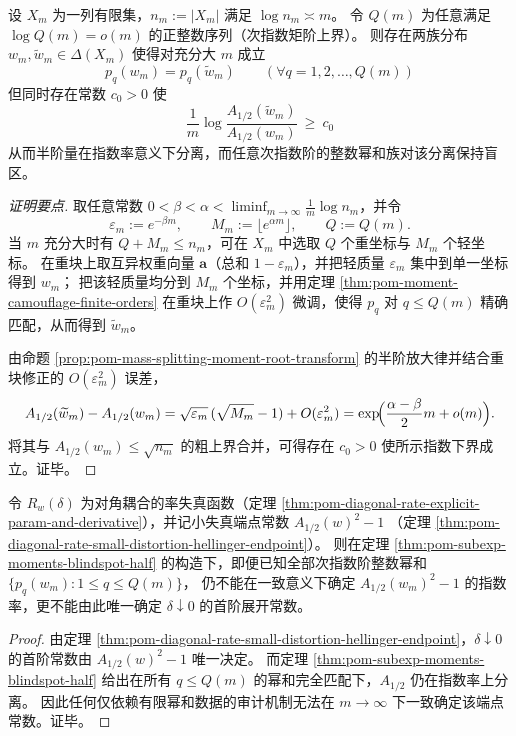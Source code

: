 \begin{theorem}\label{thm:pom-subexp-moments-blindspot-half}
设 \(X_m\) 为一列有限集，\(n_m:=|X_m|\) 满足 \(\log n_m\asymp m\)。
令 \(Q(m)\) 为任意满足 \(\log Q(m)=o(m)\) 的正整数序列（次指数矩阶上界）。
则存在两族分布 \(w_m,\widetilde w_m\in\Delta(X_m)\) 使得对充分大 \(m\) 成立
\[
\boxed{\;
p_q(w_m)=p_q(\widetilde w_m)\qquad(\forall q=1,2,\dots,Q(m))\;}
\]
但同时存在常数 \(c_0>0\) 使
\[
\boxed{\;
\frac{1}{m}\log\frac{A_{1/2}(\widetilde w_m)}{A_{1/2}(w_m)}\ \ge\ c_0\;}
\]
从而半阶量在指数率意义下分离，而任意次指数阶的整数幂和族对该分离保持盲区。
\end{theorem}
\begin{proof}[证明要点]
取任意常数 \(0<\beta<\alpha<\liminf_{m\to\infty}\frac{1}{m}\log n_m\)，并令
\[
\varepsilon_m:=e^{-\beta m},\qquad M_m:=\bigl\lfloor e^{\alpha m}\bigr\rfloor,
\qquad Q:=Q(m).
\]
当 \(m\) 充分大时有 \(Q+M_m\le n_m\)，可在 \(X_m\) 中选取 \(Q\) 个重坐标与 \(M_m\) 个轻坐标。
在重块上取互异权重向量 \(\mathbf a\)（总和 \(1-\varepsilon_m\)），并把轻质量 \(\varepsilon_m\) 集中到单一坐标得到 \(w_m\)；
把该轻质量均分到 \(M_m\) 个坐标，并用定理 \ref{thm:pom-moment-camouflage-finite-orders} 在重块上作 \(O(\varepsilon_m^2)\) 微调，使得 \(p_q\) 对 \(q\le Q(m)\) 精确匹配，从而得到 \(\widetilde w_m\)。
\par
由命题 \ref{prop:pom-mass-splitting-moment-root-transform} 的半阶放大律并结合重块修正的 \(O(\varepsilon_m^2)\) 误差，
\[
A_{1/2}(\widetilde w_m)-A_{1/2}(w_m)
=\sqrt{\varepsilon_m}\,(\sqrt{M_m}-1)+O(\varepsilon_m^2)
=\exp\!\Bigl(\frac{\alpha-\beta}{2}m+o(m)\Bigr).
\]
将其与 \(A_{1/2}(w_m)\le \sqrt{n_m}\) 的粗上界合并，可得存在 \(c_0>0\) 使所示指数下界成立。证毕。
\end{proof}

\begin{corollary}[半阶端点常数对次指数整数矩族不可识别]\label{cor:pom-half-endpoint-constant-subexp-mom-invisible}
令 \(R_w(\delta)\) 为对角耦合的率失真函数（定理 \ref{thm:pom-diagonal-rate-explicit-param-and-derivative}），并记小失真端点常数
\(
A_{1/2}(w)^2-1
\)
（定理 \ref{thm:pom-diagonal-rate-small-distortion-hellinger-endpoint}）。
则在定理 \ref{thm:pom-subexp-moments-blindspot-half} 的构造下，即便已知全部次指数阶整数幂和
\(\{p_q(w_m):1\le q\le Q(m)\}\)，
仍不能在一致意义下确定 \(A_{1/2}(w_m)^2-1\) 的指数率，更不能由此唯一确定 \(\delta\downarrow 0\) 的首阶展开常数。
\end{corollary}
\begin{proof}
由定理 \ref{thm:pom-diagonal-rate-small-distortion-hellinger-endpoint}，\(\delta\downarrow 0\) 的首阶常数由 \(A_{1/2}(w)^2-1\) 唯一决定。
而定理 \ref{thm:pom-subexp-moments-blindspot-half} 给出在所有 \(q\le Q(m)\) 的幂和完全匹配下，\(A_{1/2}\) 仍在指数率上分离。
因此任何仅依赖有限幂和数据的审计机制无法在 \(m\to\infty\) 下一致确定该端点常数。证毕。
\end{proof}

